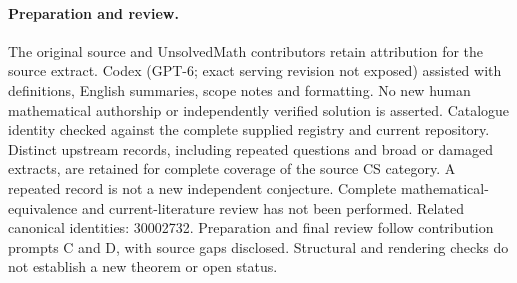 \documentclass[11pt]{article}
\begin{document}
\paragraph{Preparation and review.}
The original source and UnsolvedMath contributors retain attribution for the source extract. Codex (GPT-6; exact serving revision not exposed) assisted with definitions, English summaries, scope notes and formatting. No new human mathematical authorship or independently verified solution is asserted. Catalogue identity checked against the complete supplied registry and current repository. Distinct upstream records, including repeated questions and broad or damaged extracts, are retained for complete coverage of the source CS category. A repeated record is not a new independent conjecture. Complete mathematical-equivalence and current-literature review has not been performed. Related canonical identities: 30002732. Preparation and final review follow contribution prompts C and D, with source gaps disclosed. Structural and rendering checks do not establish a new theorem or open status.
\label{end:statement}
\end{document}
